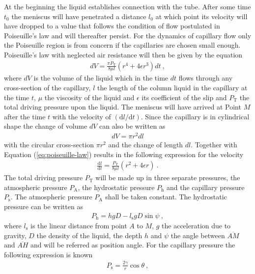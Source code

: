 \documentclass[aip, amsmath, amssymb, reprint, twocolumn, floatfix]{revtex4-1}
\newcommand{\dldt}{\frac{\mathrm{d}l}{\mathrm{d}t}}
\newcommand{\Pa}{P_\mathrm{A}}
\newcommand{\Pt}{P_\mathrm{T}}
\newcommand{\Ps}{P_\mathrm{s}}
\newcommand{\Ph}{P_\mathrm{h}}
\newcommand{\ls}{l_\mathrm{s}}
\begin{document}
At the beginning the liquid establishes connection with the tube. After some time $t_0$ the meniscus will have penetrated a distance $l_0$ at which point its velocity will have dropped to a value that follows the condition of flow postulated in Poiseuille's law and will thereafter persist. For the dynamics of capillary flow only the Poiseuille region is from concern if the capillaries are chosen small enough. Poiseuille's law with neglected air resistance will then be given by the equation
\begin{gather}
	dV = \frac{\pi \Pt}{8\mu l}\left(r^4 + 4\epsilon r^3 \right) dt~,
	\label{eq:poiseuille-law}
\end{gather}
where $dV$ is the volume of the liquid which in the time $dt$ flows through any cross-section of the capillary, $l$ the length of the column liquid in the capillary at the time $t$, $\mu$ the viscosity of the liquid and $\epsilon$ its coefficient of the slip and $\Pt$ the total driving pressure upon the liquid. The meniscus will have arrived at Point $M$ after the time $t$ with the velocity of $\left(\mathrm{d}l/\mathrm{d}t\right)$. Since the capillary is in cylindrical shape the change of volume $dV$ can also be written as
\begin{gather}
	dV = \pi r^2 dl
	\label{eq:change-cylinder}
\end{gather}
with the circular cross-section $\pi r^2$ and the change of length $dl$. Together with Equation (\ref{eq:poiseuille-law}) results in the following expression for the velocity
\begin{gather}
	\dldt = \frac{\Pt}{8\mu l}\left(r^2 + 4\epsilon r \right)~.
	\label{eq:poiseuille-velocity}
\end{gather}
The total driving pressure $\Pt$ will be made up in three separate pressures, the atmospheric pressure $\Pa$, the hydrostatic pressure $\Ph$ and the capillary pressure $\Ps$. The atmospheric pressure $\Pa$ shall be taken constant. The hydrostatic pressure can be written as
\begin{gather}
	\Ph = hgD - \ls g D \sin \psi~,
	\label{eq:hydrostatic-pressure}
\end{gather}
where $\ls$ is the linear distance from point $A$ to $M$, $g$ the acceleration due to gravity, $D$ the density of the liquid, the depth $h$ and $\psi$ the angle between $\overline{AM}$ and $\overline{AH}$ and will be referred as position angle. For the capillary pressure the following expression is known
\begin{gather}
	\Ps = \frac{2\gamma}{r}\cos \theta~,
	\label{eq:capillary-pressure}
\end{gather}
\end{document}
